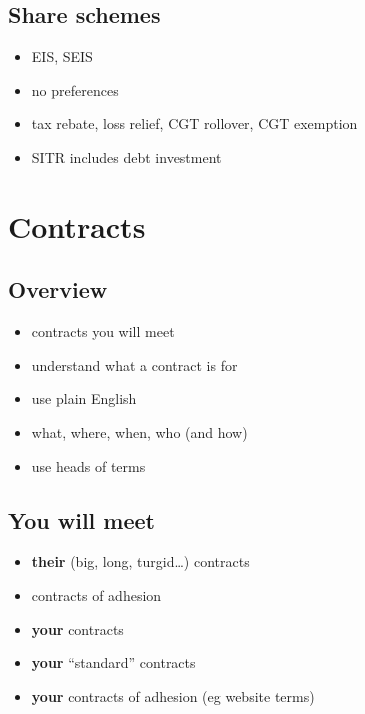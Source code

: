 \subsection{Share schemes}\label{share-schemes}

\begin{itemize}
\itemsep1pt\parskip0pt
\item
  EIS, SEIS
\item
  no preferences
\item
  tax rebate, loss relief, CGT rollover, CGT exemption
\item
  SITR includes debt investment
\end{itemize}

\section{Contracts}\label{contracts}

\subsection{Overview}\label{overview-1}

\begin{itemize}
\itemsep1pt\parskip0pt
\item
  contracts you will meet
\item
  understand what a contract is for
\item
  use plain English
\item
  what, where, when, who (and how)
\item
  use heads of terms
\end{itemize}

\subsection{You will meet}\label{you-will-meet}

\begin{itemize}
\itemsep1pt\parskip0pt
\item
  \textbf{their} (big, long, turgid\ldots{}) contracts
\item
  contracts of adhesion
\item
  \textbf{your} contracts
\item
  \textbf{your} ``standard'' contracts
\item
  \textbf{your} contracts of adhesion (eg website terms)
\end{itemize}

